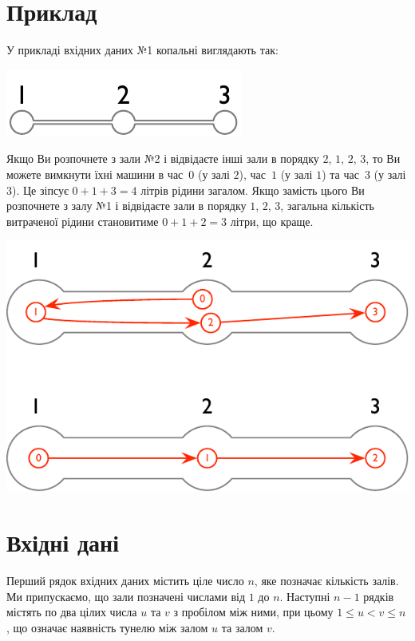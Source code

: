 \section*{Приклад}

У прикладі вхідних даних №1 копальні виглядають так:

\includegraphics[width=.2\textwidth]{img/sample-1.pdf}

Якщо Ви розпочнете з зали №2 і відвідаєте інші зали в порядку $2$, $1$, $2$, $3$, то Ви можете вимкнути їхні машини в час~$0$ (у залі $2$), час~$1$ (у залі $1$) та час~$3$ (у залі $3$).
Це зіпсує $0+1+3=4$ літрів рідини загалом.
Якщо замість цього Ви розпочнете з залу №1 і відвідаєте зали в порядку $1$, $2$, $3$, загальна кількість витраченої рідини становитиме $0+1+2=3$ літри, що краще.

\includegraphics[width=.4\textwidth]{img/sample-1-ans.pdf}

\section*{Вхідні дані}

Перший рядок вхідних даних містить ціле число $n$, яке позначає кількість залів.
Ми припускаємо, що зали позначені числами від $1$ до $n$.
Наступні $n-1$ рядків містять по два цілих числа $u$ та $v$ з пробілом між ними,
при цьому $1\leq u < v \leq n$, %
що означає наявність тунелю між залом $u$ та залом $v$.

